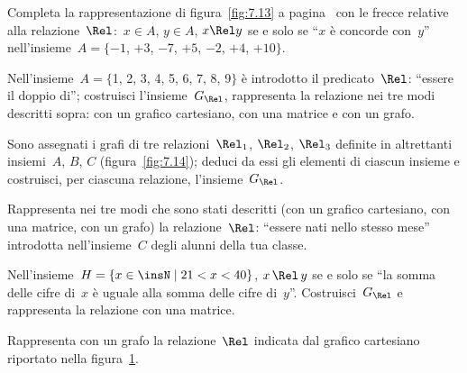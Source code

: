 \begin{esercizio}
\label{ese:\thechapter.12}
Completa la rappresentazione di figura~\ref{fig:7.13} a pagina~\pageref{fig:7.13} con le frecce relative alla relazione~$\Rel$:~$x \in A$, $y \in A$, $x \Rel y$ se e solo se ``$x$ è concorde con~$y$''
nell'insieme~$A =\{-1$, $+3$, $-7$, $+5$, $-2$, $+4$, $+10\}$.
\end{esercizio}

\begin{esercizio}
\label{ese:\thechapter.13}
Nell'insieme~$A = \{$1, 2, 3, 4, 5, 6, 7, 8, 9$\}$ è introdotto il predicato~$\Rel$: ``essere il
doppio di''; costruisci l'insieme~$G_\Rel$, rappresenta la relazione nei tre modi descritti sopra: con un grafico cartesiano,
con una matrice e con un grafo.
\end{esercizio}

\begin{esercizio}
\label{ese:\thechapter.14}
Sono assegnati i grafi di tre relazioni~$\Rel_1$, $\Rel_2$, $\Rel_3$ definite in altrettanti insiemi~$A$, $B$, $C$ (figura~\ref{fig:7.14}); deduci da essi gli elementi di ciascun
insieme e costruisci, per ciascuna relazione, l'insieme~$G_\Rel$.
\end{esercizio}

\begin{esercizio}
\label{ese:\thechapter.15}
Rappresenta nei tre modi che sono stati descritti (con un grafico cartesiano, con una matrice, con un
grafo) la relazione~$\Rel$: ``essere nati nello stesso mese'' introdotta nell'insieme~$C$ degli alunni della tua classe.
\end{esercizio}

\begin{esercizio}
\label{ese:\thechapter.16}
Nell'insieme~$H = \{ x \in \insN \mid  21 < x < 40 \}$, $x \,\Rel\, y$ se e solo se ``la somma delle cifre di~$x$ è uguale alla somma delle cifre di~$y$''.
Costruisci~$G_\Rel$ e rappresenta la relazione con una matrice.
\end{esercizio}

\begin{esercizio}
\label{ese:\thechapter.17}
Rappresenta con un grafo la relazione~$\Rel$ indicata dal grafico cartesiano riportato nella figura~\ref{fig:7.15}.
\end{esercizio}

\begin{figure}[b]
\begin{minipage}[b]{.69\textwidth}
 \centering
 
 \caption{}\label{fig:7.14}
\end{minipage}\
\begin{minipage}[b]{.3\textwidth}
 \centering
 
 \caption{}\label{fig:7.15}
\end{minipage}
\end{figure}

